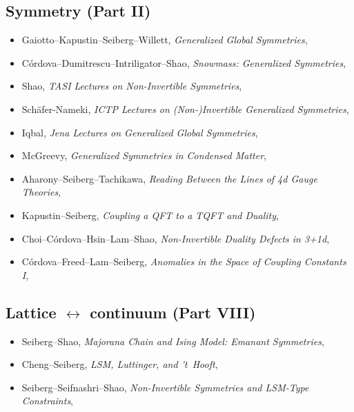 \subsection*{Symmetry (Part II)}
\begin{itemize}
\item[$\circ$] Gaiotto--Kapustin--Seiberg--Willett, \emph{Generalized Global Symmetries}, 
\item[$\bullet$] C\'ordova--Dumitrescu--Intriligator--Shao, \emph{Snowmass: Generalized Symmetries}, 
\item[$\bullet$] Shao, \emph{TASI Lectures on Non-Invertible Symmetries}, 
\item[$\bullet$] Sch\"afer-Nameki, \emph{ICTP Lectures on (Non-)Invertible Generalized Symmetries}, 
\item[$\bullet$] Iqbal, \emph{Jena Lectures on Generalized Global Symmetries}, 
\item[$\bullet$] McGreevy, \emph{Generalized Symmetries in Condensed Matter}, 
\item[$\circ$] Aharony--Seiberg--Tachikawa, \emph{Reading Between the Lines of 4d Gauge Theories}, 
\item[$\circ$] Kapustin--Seiberg, \emph{Coupling a QFT to a TQFT and Duality}, 
\item[$\circ$] Choi--C\'ordova--Hsin--Lam--Shao, \emph{Non-Invertible Duality Defects in 3+1d}, 
\item[$\circ$] C\'ordova--Freed--Lam--Seiberg, \emph{Anomalies in the Space of Coupling Constants I}, 
\end{itemize}

\subsection*{Lattice $\leftrightarrow$ continuum (Part VIII)}
\begin{itemize}
\item[$\circ$] Seiberg--Shao, \emph{Majorana Chain and Ising Model: Emanant Symmetries}, 
\item[$\circ$] Cheng--Seiberg, \emph{LSM, Luttinger, and 't~Hooft}, 
\item[$\circ$] Seiberg--Seifnashri--Shao, \emph{Non-Invertible Symmetries and LSM-Type Constraints}, 
\end{itemize}

